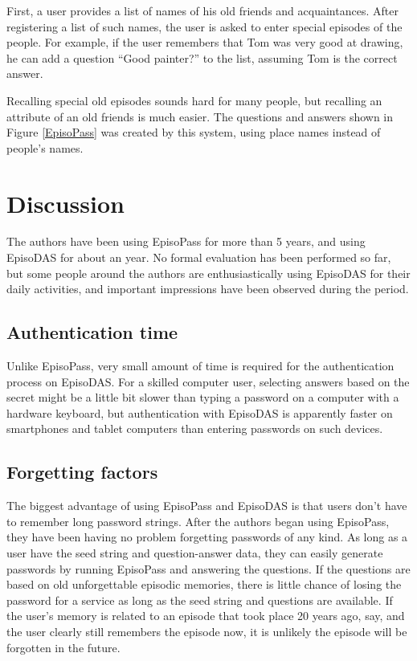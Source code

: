 \documentclass[sigconf]{acmart}
\begin{document}
First, a user provides a list of names of his old friends and acquaintances.
After registering a list of such names,
the user is asked to enter special episodes of the people.
For example, if the user remembers that Tom was
very good at drawing, he can add a question
``Good painter?'' to the list, assuming Tom is the correct answer.

Recalling special old episodes sounds hard for many people, but
recalling an attribute of an old friends is much easier.
The questions and answers shown in Figure \ref{EpisoPass} was
created by this system,
using place names instead of people's names.

\section{Discussion}

The authors have been using EpisoPass for more than 5 years, and
using EpisoDAS for about an year.
No formal evaluation has been performed so far, but
some people around the authors are enthusiastically using
EpisoDAS for their daily activities, and
important impressions have been observed during the period.

\subsection{Authentication time}

Unlike EpisoPass,
very small amount of time is required for
the authentication process on EpisoDAS.
For a skilled computer user,
selecting answers based on the secret might be a little bit slower than
typing a password on a computer with a hardware keyboard, but
authentication with
EpisoDAS is apparently faster on smartphones and tablet computers
than entering passwords on such devices.

\subsection{Forgetting factors}

The biggest advantage of using EpisoPass and EpisoDAS is that users don't have to
remember long password strings.
%
After the authors began using EpisoPass,
they have been having no problem forgetting passwords of any kind.
%
As long as a user have the seed string and question-answer data,
they can easily generate passwords by running
EpisoPass and answering the questions.
%
If the questions are based on old unforgettable episodic memories,
there is little chance of losing the password for a service
as long as the seed string and questions are available.
%
If the user's memory is related to an episode that took place 20 years
ago, say, and the user clearly still remembers the episode now, it is
unlikely the episode will be forgotten in the future.
\end{document}
